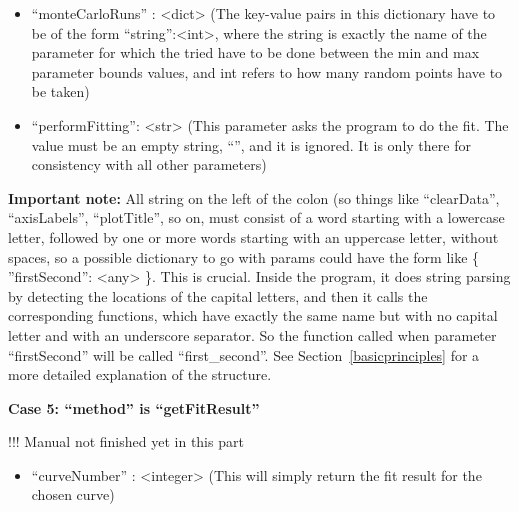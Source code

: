 \documentclass[11pt]{article} %
\begin{document}
\begin{tcolorbox}[breakable,title=Sending ``params'' to the server]
\begin{itemize}
\item ``monteCarloRuns'' : <dict> (The key-value pairs in this dictionary have to be of the form ``string'':<int>, where the string is exactly the name of the parameter for which the tried have to be done between the min and max parameter bounds values, and int refers to how many random points have to be taken)

\item ``performFitting'': <str> (This parameter asks the program to do the fit. The value must be an empty string, ``'', and it is ignored. It is only there for consistency with all other parameters)

\end{itemize}


\textbf{Important note:} All string on the left of the colon (so things like ``clearData'', ``axisLabels'', ``plotTitle'', so on, must consist of a word starting with a lowercase letter, followed by one or more words starting with an uppercase letter, without spaces, so a possible dictionary to go with params could have the form like { \{ {''}firstSecond{''}: <any> \}}. This is crucial. Inside the program, it does string parsing by detecting the locations of the capital letters, and then it calls the corresponding functions, which have exactly the same name but with no capital letter and with an underscore separator. So the function called when parameter ``firstSecond'' will be called ``first\_second''. See Section~\ref{basicprinciples} for a more detailed explanation of the structure.  

\textbf{Case 5: ``method'' is ``getFitResult''}

!!! Manual not finished yet in this part

\begin{itemize}
\item ``curveNumber'' : <integer> (This will simply return the fit result for the chosen curve)
\end{itemize}

\end{tcolorbox}



 

\end{document}
